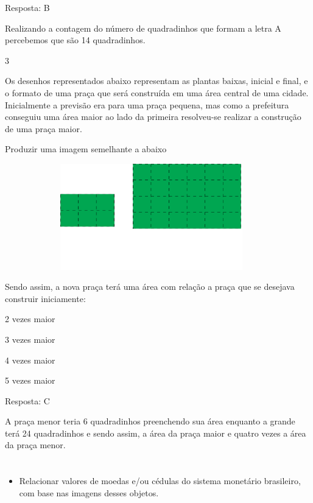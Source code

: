 \begin{escolha}
Resposta: B

Realizando a contagem do número de quadradinhos que formam a letra A
percebemos que são 14 quadradinhos.

\num{3}

Os desenhos representados abaixo representam as plantas baixas, inicial
e final, e o formato de uma praça que será construída em uma área
central de uma cidade. Inicialmente a previsão era para uma praça
pequena, mas como a prefeitura conseguiu uma área maior ao lado da
primeira resolveu-se realizar a construção de uma praça maior.

Produzir uma imagem semelhante a abaixo

\includegraphics[width=5.00877in,height=1.80849in]{media/image63.png}

Sendo assim, a nova praça terá uma área com relação a praça que se
desejava construir iniciamente:

\begin{escolha}
\item
  2 vezes maior
\item
  3 vezes maior
\item
  4 vezes maior
\item
  5 vezes maior
\end{escolha}

Resposta: C

A praça menor teria 6 quadradinhos preenchendo sua área enquanto a
grande terá 24 quadradinhos e sendo assim, a área da praça maior e
quatro vezes a área da praça menor.

\chapter{}



\begin{itemize}
    \item Relacionar valores de moedas e/ou cédulas do sistema monetário
brasileiro, com base nas imagens desses objetos.


\end{itemize}
\end{escolha}
